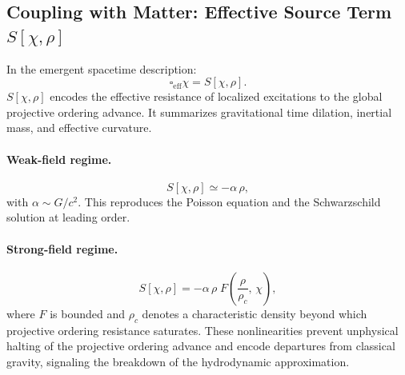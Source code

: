 \subsection{Coupling with Matter: Effective Source Term \texorpdfstring{$S[\chi,\rho]$}{S[χ,ρ]}}
  \label{subsec:coupling_matter_chi}

  In the emergent spacetime description:
  \begin{equation}
    \square_{\mathrm{eff}}\chi = S[\chi,\rho].
    \label{eq:chi_effective_source}
  \end{equation}
  $S[\chi,\rho]$ encodes the effective resistance of localized
  excitations to the global projective ordering advance.
  It summarizes gravitational time dilation, inertial mass, and
  effective curvature.

  \paragraph{Weak-field regime.}
    \begin{equation}
      S[\chi,\rho] \simeq -\alpha\,\rho,
      \label{eq:linear_source}
    \end{equation}
    with $\alpha \sim G/c^2$.
    This reproduces the Poisson equation and the Schwarzschild solution at
    leading order.

  \paragraph{Strong-field regime.}
    \begin{equation}
      S[\chi,\rho]
      = -\alpha\,\rho\;
      F\!\left(
           \frac{\rho}{\rho_c},\,\chi
      \right),
      \label{eq:nonlinear_source}
    \end{equation}
    where $F$ is bounded and $\rho_c$ denotes a characteristic density
    beyond which projective ordering resistance saturates.
    These nonlinearities prevent unphysical halting of the projective
    ordering advance and encode departures from classical gravity,
    signaling the breakdown of the hydrodynamic approximation.
